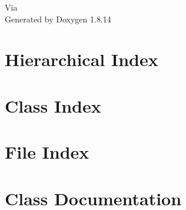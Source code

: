 \documentclass[twoside]{book}
\newcommand{\+}{\discretionary{\mbox{\scriptsize$\hookleftarrow$}}{}{}}
\newcommand{\clearemptydoublepage}{%
  \newpage{\pagestyle{empty}\cleardoublepage}%
}
\begin{document}
\hypersetup{pageanchor=false,
             bookmarksnumbered=true,
             pdfencoding=unicode
            }
\begin{titlepage}
\vspace*{7cm}
\begin{center}%
{\Large Via }\\
\vspace*{1cm}
{\large Generated by Doxygen 1.8.14}\\
\end{center}
\end{titlepage}
\clearemptydoublepage
{}
\tableofcontents
\clearemptydoublepage
{}
\hypersetup{pageanchor=true}

\chapter{Hierarchical Index}

\chapter{Class Index}

\chapter{File Index}

\chapter{Class Documentation}






























\end{document}
